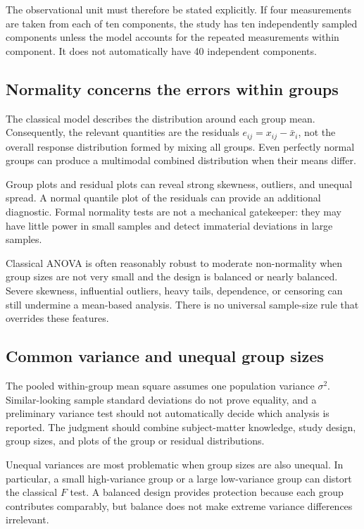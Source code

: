 The observational unit must therefore be stated explicitly. If four measurements are taken from each of ten components, the study has ten independently sampled components unless the model accounts for the repeated measurements within component. It does not automatically have 40 independent components.

\subsection{Normality concerns the errors within groups}

The classical model describes the distribution around each group mean. Consequently, the relevant quantities are the residuals $e_{ij}=x_{ij}-\bar x_i$, not the overall response distribution formed by mixing all groups. Even perfectly normal groups can produce a multimodal combined distribution when their means differ.

Group plots and residual plots can reveal strong skewness, outliers, and unequal spread. A normal quantile plot of the residuals can provide an additional diagnostic. Formal normality tests are not a mechanical gatekeeper: they may have little power in small samples and detect immaterial deviations in large samples.

Classical ANOVA is often reasonably robust to moderate non-normality when group sizes are not very small and the design is balanced or nearly balanced. Severe skewness, influential outliers, heavy tails, dependence, or censoring can still undermine a mean-based analysis. There is no universal sample-size rule that overrides these features.

\subsection{Common variance and unequal group sizes}

The pooled within-group mean square assumes one population variance $\sigma^2$. Similar-looking sample standard deviations do not prove equality, and a preliminary variance test should not automatically decide which analysis is reported. The judgment should combine subject-matter knowledge, study design, group sizes, and plots of the group or residual distributions.

Unequal variances are most problematic when group sizes are also unequal. In particular, a small high-variance group or a large low-variance group can distort the classical $F$ test. A balanced design provides protection because each group contributes comparably, but balance does not make extreme variance differences irrelevant.

